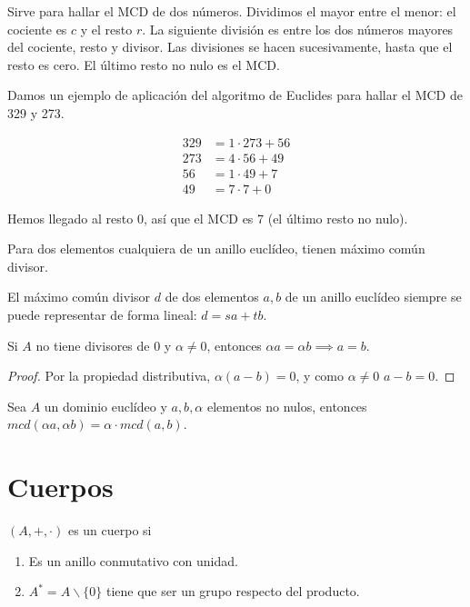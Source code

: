 \documentclass[nochap]{apuntes}
\begin{document}
\begin{defn} Sirve para hallar el MCD de dos números. Dividimos el mayor entre el menor: el cociente es $c$ y el resto $r$. La siguiente división es entre los dos números mayores del cociente, resto y divisor. Las divisiones se hacen sucesivamente, hasta que el resto es cero. El último resto no nulo es el MCD.\end{defn}

Damos un ejemplo de aplicación del algoritmo de Euclides para hallar el MCD de 329 y 273.

\begin{align*}
329&=1\cdot 273 +56 \\
273&=4\cdot 56 + 49 \\
56&= 1 \cdot 49 + 7 \\
49&= 7\cdot 7 +0
\end{align*}

Hemos llegado al resto 0, así que el MCD es 7 (el último resto no nulo).

\begin{corol}Para dos elementos cualquiera de un anillo euclídeo, tienen máximo común divisor.

El máximo común divisor $d$ de dos elementos $a, b$ de un anillo euclídeo siempre se puede representar de forma lineal: $d=sa +tb$.\end{corol}

\begin{lemma}
Si $A$ no tiene divisores de 0 y $\alpha \neq 0$, entonces $\alpha a = \alpha b \implies a=b$.\end{lemma}
\begin{proof}
Por la propiedad distributiva, $\alpha (a-b)=0$, y como $\alpha \neq 0$ $a-b=0$.
\end{proof}

\begin{lemma}Sea $A$ un dominio euclídeo y $a,b,\alpha$ elementos no nulos, entonces $mcd(\alpha a, \alpha b)=\alpha \cdot mcd(a, b)$.\end{lemma}


\section{Cuerpos}

\begin{defn}[Cuerpo] $(A, +, \cdot)$ es un cuerpo si \begin{enumerate}
\item Es un anillo conmutativo con unidad.
\item $A^*=A \backslash \{0\}$ tiene que ser un grupo respecto del producto.
\end{enumerate}
\end{defn}
\end{document}
